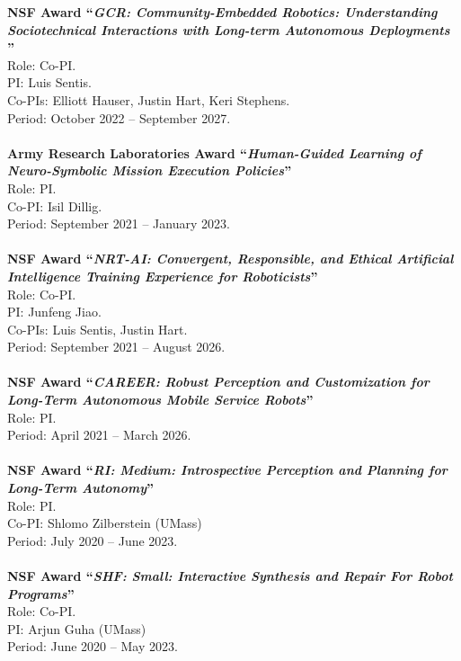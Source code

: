 \documentclass[Times]{article}
\newcommand{\funding}[1]{#1\\}
\renewcommand{\funding}[1]{\\}
\begin{document}
\textbf{NSF Award ``\emph{GCR: Community-Embedded Robotics: Understanding Sociotechnical Interactions with Long-term Autonomous Deployments
}''}\\
Role: Co-PI.\\
PI: Luis Sentis.\\
Co-PIs: Elliott Hauser, Justin Hart, Keri Stephens.\\
Period: October 2022 -- September 2027.\\
\funding{Amount: \$3,600,000}

\textbf{Army Research Laboratories Award ``\emph{Human-Guided Learning of Neuro-Symbolic Mission Execution Policies}''}\\
Role: PI.\\
Co-PI: Isil Dillig.\\
Period: September 2021 -- January 2023.\\
\funding{Amount: \$372,798}

\textbf{NSF Award ``\emph{NRT-AI: Convergent, Responsible, and Ethical Artificial Intelligence Training Experience for Roboticists}''}\\
Role: Co-PI.\\
PI: Junfeng Jiao.\\
Co-PIs: Luis Sentis, Justin Hart.\\
Period: September 2021 -- August 2026.\\
\funding{Amount: \$2,999,999.}

\textbf{NSF Award ``\emph{CAREER: Robust Perception and Customization for Long-Term Autonomous Mobile Service Robots}''}\\
Role: PI.\\
Period: April 2021 -- March 2026.\\
\funding{Amount: \$590,469.}

\textbf{NSF Award ``\emph{RI: Medium: Introspective Perception and Planning for Long-Term Autonomy}''}\\
Role: PI.\\
Co-PI: Shlomo Zilberstein (UMass)\\
Period: July 2020 -- June 2023.\\
\funding{PI Biswas' share: \$600,000.}

\textbf{NSF Award ``\emph{SHF: Small: Interactive Synthesis and Repair For Robot Programs}''}\\
Role: Co-PI.\\
PI: Arjun Guha (UMass)\\
Period: June 2020 -- May 2023.\\
\funding{PI Biswas' share: \$250,001.}
\end{document}
